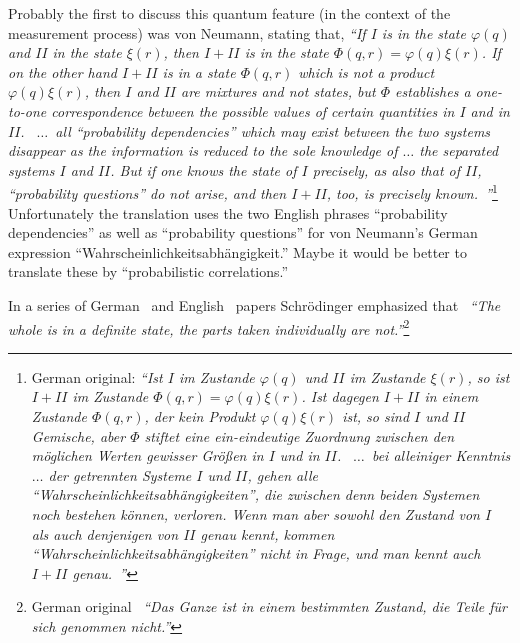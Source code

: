 Probably the first to discuss this quantum feature (in the context of the measurement process)
was von Neumann,
stating  that,
{\em ``If
$I$ is in the state $\varphi ( q )$ and $II$ in the state $\xi ( r )$,
then $I + II$ is in the state $\Phi ( q, r ) = \varphi ( q ) \xi ( r )$.
If on
the other hand $I + II$ is in a state $\Phi ( q, r )$ which is
not a product $\varphi ( q ) \xi ( r )$, then $I$ and $II$ are mixtures
and not states, but $\Phi$ establishes a one-to-one correspondence
between the possible values of certain quantities in
$I$ and in $II$.~\cite[Section~VI.2, pp~436-437]{v-neumann-55} }
{\em  $\ldots$~all ``probability dependencies'' which may
exist between the two systems disappear as the information
is reduced to the sole knowledge of $\ldots$
the separated systems $I$ and $II$. But if one knows the
state of $I$ precisely, as also that of $II$, ``probability
questions'' do not arise, and then $I + II$, too, is precisely known.~\cite[Section~VI.2, p~426]{v-neumann-55}''}\footnote{
German original:
{\em ``Ist $I$ im
Zustande $\varphi (q)$ und $II$ im Zustande $\xi (r)$, so ist $I + II$ im Zustande
$\Phi (q , r)  = \varphi (q) \xi (r)$. Ist dagegen $I + II$ in einem Zustande $\Phi (q , r)$, der
kein Produkt $\varphi (q) \xi (r)$ ist, so sind $I$ und $II$ Gemische, aber $\Phi$ stiftet
eine ein-eindeutige Zuordnung zwischen den m\"oglichen Werten gewisser
Gr\"o\ss en in $I$ und in $II$.~\cite[Section~VI.2, p~232]{v-neumann-55} }
{\em  $\ldots$~bei alleiniger Kenntnis $\ldots$ der getrennten
Systeme $I$ und $II$, gehen alle ``Wahrscheinlichkeitsabh\"angigkeiten'',
die zwischen denn beiden Systemen noch bestehen k\"onnen, verloren.
Wenn man aber sowohl den Zustand von $I$ als auch denjenigen von $II$
genau kennt, kommen ``Wahrscheinlichkeitsabh\"angigkeiten'' nicht in
Frage, und man kennt auch $I + II$ genau.~\cite[Section~VI.2, p~227]{v-neumann-55}''}
}
Unfortunately the translation uses the two English phrases ``probability dependencies'' as well as ``probability questions''
for von Neumann's German expression ``Wahrscheinlichkeitsabh\"angigkeit.''
Maybe it would be better to translate these by ``probabilistic correlations.''

In a series of German~\cite{schrodinger} and English~\cite{CambridgeJournals:2027212,CambridgeJournals:1737068} papers
Schr\"odinger
emphasized that~\cite[\S~10, p.~332]{schrodinger-en-10.2307/986572}
{\em ``The whole is in a definite state, the parts taken individually are not.''}\footnote{
German original~\cite[\S~10, p.~827]{schrodinger} {\em ``Das Ganze ist in einem bestimmten Zustand,
die Teile f\"ur sich genommen nicht.''}
}

